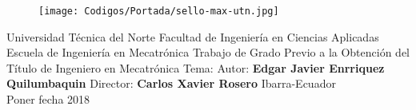 
\begin{center}


\begin{figure} 
\centering \texttt{[image: Codigos/Portada/sello-max-utn.jpg]} 
\end{figure}


{\Large \sc Universidad T\'ecnica del Norte} \vskip 1cm
{\Large \sc Facultad de Ingenier\'ia en Ciencias Aplicadas} \vskip 1cm
{\Large \sc Escuela de Ingenier\'ia en Mecatr\'onica} \vskip 1.7cm
{\Large \sc Trabajo de Grado Previo a la Obtenci\'on del T\'itulo de Ingeniero en Mecatr\'onica} \vskip 2cm
{\large \sc Tema:} \vskip 0.8cm
{\Large \bf {}}\vskip 1.5cm
{\large \sc Autor: {\bf \sc \Large Edgar Javier Enrriquez Quilumbaquin}}\vskip 0.8cm
{\large \sc Director: {\bf \sc \Large Carlos Xavier Rosero}}
\vfill {\sc \large Ibarra-Ecuador\\Poner fecha 2018}
\thispagestyle{empty}

\end{center}





